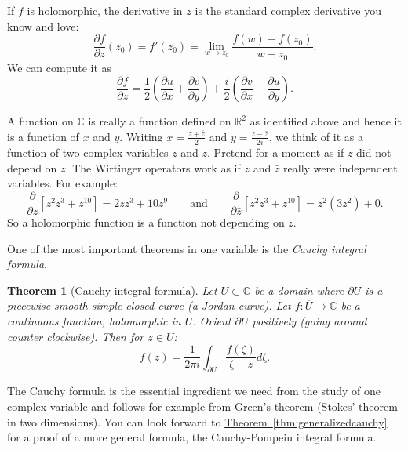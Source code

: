 \documentclass[12pt,openany]{book}
\newcommand{\C}{{\mathbb{C}}}
\newcommand{\R}{{\mathbb{R}}}
\newcommand{\myindex}[1]{#1\index{#1}}
\theoremstyle{plain}
\newtheorem{thm}{Theorem}[section]
\theoremstyle{remark}
\theoremstyle{definition}
\theoremstyle{exercise}
\theoremstyle{example}
\newcommand{\thmref}[1]{\hyperref[#1]{Theorem~\ref*{#1}}}
\begin{document}
If $f$ is holomorphic,
the derivative in $z$ is the standard complex derivative you know and love:
\begin{equation*}
\frac{\partial f}{\partial z} (z_0)
=
f'(z_0)
=
\lim_{w \to z_0} \frac{f(w)-f(z_0)}{w-z_0} .
\end{equation*}
We can compute it as
\begin{equation*}
\frac{\partial f}{\partial z} 
=
\frac{1}{2}
\left(
\frac{\partial u}{\partial x} 
+ \frac{\partial v}{\partial y}
\right)
+
\frac{i}{2}
\left( \frac{\partial v}{\partial x} - \frac{\partial u}{\partial y}
\right) .
\end{equation*}

A function on $\C$ is really a function defined on
$\R^2$ as identified above and hence it is a function of $x$ and $y$.
Writing
$x = \frac{z+\bar{z}}{2}$ and
$y = \frac{z-\bar{z}}{2i}$, we think of it as a function of two
complex variables $z$ and $\bar{z}$.  Pretend for a moment as if $\bar{z}$ did not
depend on $z$.
The Wirtinger operators
work as if $z$ and $\bar{z}$ really were independent variables.  For example:
\begin{equation*}
\frac{\partial}{\partial z}
\left[ z^2 \bar{z}^3 + z^{10} \right]
=
2z \bar{z}^3 + 10 z^{9}
\qquad
\text{and}
\qquad
\frac{\partial}{\partial \bar{z}}
\left[ z^2 \bar{z}^3 + z^{10} \right]
=
z^2 ( 3 \bar{z}^2 ) + 0 .
\end{equation*}
So a holomorphic function is a function not depending on $\bar{z}$.

One of the most important theorems in one variable is
the \emph{\myindex{Cauchy integral formula}}.

\begin{thm}[Cauchy integral formula]
Let $U \subset \C$ be a domain where $\partial U$ is a piecewise smooth
simple closed curve (a Jordan curve).  Let $f \colon \overline{U} \to \C$ be a continuous function,
holomorphic in $U$.
Orient $\partial U$ positively (going around counter clockwise).
Then for $z \in U$:
\begin{equation*}
f(z) =
\frac{1}{2\pi i}
\int_{\partial U}
\frac{f(\zeta)}{\zeta-z}
d \zeta .
\end{equation*}
\end{thm}

The Cauchy formula is the essential ingredient we need from the study of
one complex variable and follows for example
from Green's theorem (Stokes' theorem in two
dimensions).  You can look forward to
\thmref{thm:generalizedcauchy} for a proof of a more general formula,
the Cauchy-Pompeiu integral formula.
\end{document}
